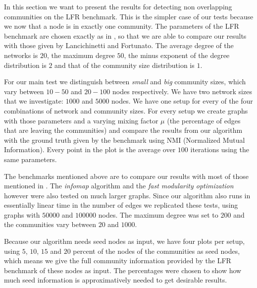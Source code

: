 In this section we want to present the results for detecting non overlapping communities on the LFR benchmark. This is the simpler case of our tests because we now that a node is in exactly one community. The parameters of the LFR benchmark are chosen exactly as in \cite{LF09}, so that we are able to compare our results with those given by Lancichinetti and Fortunato. The average degree of the networks is $20$, the maximum degree $50$, the minus exponent of the degree distribution is $2$ and that of the community size distribution is $1$.

For our main test we distinguish between \textit{small} and \textit{big} community sizes, which vary between $10 - 50$ and $20 - 100$ nodes respectively. We have two network sizes that we investigate: $1000$ and $5000$ nodes. We have one setup for every of the four combinations of network and community sizes. For every setup we create graphs with those parameters and a varying mixing factor $\mu$ (the percentage of edges that are leaving the communities) and compare the results from our algorithm with the ground truth given by the benchmark using NMI (Normalized Mutual Information). Every point in the plot is the average over $100$ iterations using the same parameters. 

The benchmarks mentioned above are to compare our results with most of those mentioned in \cite{LF09}. The \textit{infomap} algorithm \cite{RB08} and the \textit{fast modularity optimization} \cite{BGLL08} however were also tested on much larger graphs.
Since our algorithm also runs in essentially linear time in the number of edges we replicated these tests, using graphs with $50000$ and $100000$ nodes. The maximum degree was set to $200$ and the communities vary between $20$ and $1000$.

Because our algorithm needs seed nodes as input, we have four plots per setup, using $5$, $10$, $15$ and $20$ percent of the nodes of the communities as seed nodes, which means we give the full community information provided by the LFR benchmark of these nodes as input. The percentages were chosen to show how much seed information is approximatively needed to get desirable results.